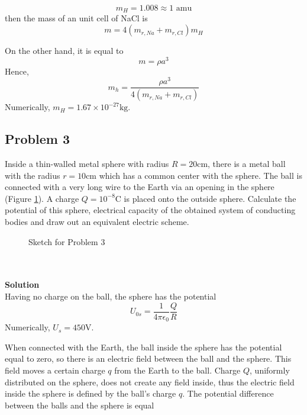 \documentclass[12pt,a4paper]{book}
\begin{document}
	\begin{equation*}
		m_H=1.008\approx1\text{ amu}
	\end{equation*}
	then the mass of an unit cell of NaCl is
	\begin{equation*}
		m=4(m_{r,Na}+m_{r,Cl})m_H
	\end{equation*}\par
	On the other hand, it is equal to
	\begin{equation*}
		m=\rho a^3
	\end{equation*}
	Hence,
	\begin{equation}
		m_h=\frac{\rho a^3}{4(m_{r,Na}+m_{r,Cl})}
	\end{equation}
	Numerically, $m_H=1.67\times10^{-27}\text{kg}$.
	\subsection*{Problem 3}
	Inside a thin-walled metal sphere with radius $R=20\text{cm}$, there is a metal ball with the radius $r=10\text{cm}$ which has a common center with the sphere. The ball is connected with a very long wire to the Earth via an opening in the sphere (Figure \ref{sketch_4_3_1}). A charge $Q=10^{-8}\text{C}$ is placed onto the outside sphere. Calculate the potential of this sphere, electrical capacity of the obtained system of conducting bodies and draw out an equivalent electric scheme.
	\begin{figure}
		[!hbtp]
		\centering
		\caption{Sketch for Problem 3}
		\label{sketch_4_3_1}
	\end{figure}\\ \\
	\textbf{Solution}\\
	Having no charge on the ball, the sphere has the potential
	\begin{equation*}
		U_{0s}=\frac{1}{4\pi\epsilon_0}\frac{Q}{R}
	\end{equation*}
	Numerically, $U_s=450\text{V}$.\par
	When connected with the Earth, the ball inside the sphere has the potential equal to zero, so there is an electric f\mbox{}ield between the ball and the sphere. This f\mbox{}ield moves a certain charge $q$ from the Earth to the ball. Charge $Q$, uniformly distributed on the sphere, does not create any f\mbox{}ield inside, thus the electric f\mbox{}ield inside the sphere is def\mbox{}ined by the ball's charge $q$. The potential dif\mbox{}ference between the balls and the sphere is equal
\end{document}
